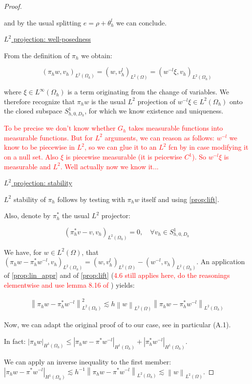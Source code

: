 \documentclass[english,a4paper,9pt,oneside]{scrbook}	%
\theoremstyle{break}
\newenvironment{mproof}[1][\proofname]{%
  \begin{proof}[#1]$ $\par\nobreak\ignorespaces
}{%
  \end{proof}
}
\renewcommand*{\proofname}{Proof}
\theoremstyle{remark}
\newcommand{\norm}[1]{\left\lVert#1\right\rVert}
\begin{document}
\begin{appendices}
\begin{mproof}
and by the usual splitting $e=\rho + \theta_h^l$ we can conclude.

\underline{$L^2$ projection: well-posedness}

From the definition of $\pi_h$ we obtain:

$$(\pi_h w, v_h)_{L^2(\Omega_h)}=(w, v_h^l)_{L^2(\Omega)}  = (w^{-l} \xi, v_h)_{L^2(\Omega_h)}$$

where $\xi \in L^\infty(\Omega_h)$ is a term originating from the change of variables. We therefore recognize that $\pi_h w$ is the usual $L^2$ projection of $w^{-l} \xi\in L^2(\Omega_h)$ onto the closed subspace $S^1_{h,0,D_h}$, for which we know existence and uniqueness.

\textcolor{red}{To be precise we don't know whether $G_h$ takes measurable functions into measurable functions. But for $L^2$ arguments, we can reason as follows: $w^{-l}$ we know to be piecewise in $L^2$, so we can glue it to an $L^2$ fcn by in case modifying it on a null set. Also $\xi$ is piecewise measurable (it is peicewise $C^1$). So $w^{-l}\xi$ is measurable and $L^2$. Well actually now we know it...}

\underline{$L^2$ projection: stability}

$L^2$ stability of $\pi_h$ follows by testing with $\pi_h w$ itself and using \cref{prop:lift}.

Also, denote by $\pi_h^*$ the usual $L^2$ projector:

$$(\pi_h^* v - v, v_h)_{L^2(\Omega_h)}=0,\quad \forall  v_h \in S^1_{h,0,D_h}$$

We have, for $w \in L^2(\Omega)$, that $(\pi_h w - \pi_h^* w^{-l}, v_h)_{L^2(\Omega_h)} = (w, v_h^l)_{L^2(\Omega)} - (w^{-l}, v_h)_{L^2(\Omega_h)}$. An application of \cref{prop:lin_appr} and of \cref{prop:lift} (\textcolor{red}{4.6 still applies here, do the reasonings elementwise and use lemma 8.16 of \cite{ranner}}) yields:

\begin{align*}
	\norm{\pi_h w - \pi_h^* w^{-l}}^2_{L^2(\Omega_h)}\lesssim h \norm{w}_{L^2(\Omega)}\norm{\pi_h w - \pi_h^* w^{-l}}_{L^2(\Omega_h)}
\end{align*}

Now, we can adapt the original proof of \cite{bank} to our case, see in particular (A.1).

In fact: $|\pi_h w|_{H^1(\Omega_h)}\leq |\pi_h w -\pi^* w^{-l}|_{H^1(\Omega_h)} + |\pi_h^* w^{-l}|_{H^1(\Omega_h)}$.

We can apply an inverse inequality to the first member: $|\pi_h w -\pi^* w^{-l}|_{H^1(\Omega_h)}\lesssim h^{-1}\norm{\pi_h w -\pi^* w^{-l}}_{L^2(\Omega_h)}\lesssim \norm{w}_{L^2(\Omega)}$.


\end{mproof}
\end{appendices}
\end{document}
